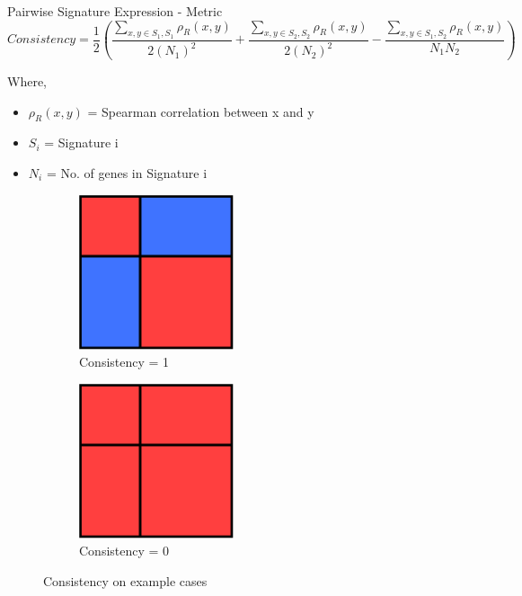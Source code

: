 \documentclass[aspectratio=169,9pt]{beamer}
\begin{document}
    \begin{frame}{Pairwise Signature Expression - Metric}
        $$Consistency = \frac{1}{2}(\frac{\sum_{x,y \in S_1, S_1} \rho_R(x,y)}{2 (N_1)^2} + \frac{\sum_{x,y \in S_2, S_2} \rho_R(x,y)}{2 (N_2)^2} - \frac{\sum_{x,y \in S_1, S_2} \rho_R(x,y)}{N_1 N_2})$$
        {\footnotesize Where,
        \begin{itemize}
            \item $\rho_R(x,y)$ = Spearman correlation between x and y
            \item $S_i$ = Signature i
            \item $N_i$ = No. of genes in Signature i
        \end{itemize}}
        \pause
        \begin{adjustwidth}{-5cm}{-5cm}
            \centering
            \begin{figure}
                \centering
                \begin{subfigure}[c]{0.5\textwidth}
                    \centering
                    \includegraphics[width=0.5\textwidth]{strong_teams}
                    \caption{Consistency = 1}
                \end{subfigure}
                \begin{subfigure}[c]{0.5\textwidth}
                    \centering
                    \includegraphics[width=0.5\textwidth]{no_teams}
                    \caption{Consistency = 0}
                \end{subfigure}
                \caption{Consistency on example cases}
            \end{figure}
        \end{adjustwidth}
    \end{frame}
\end{document}
